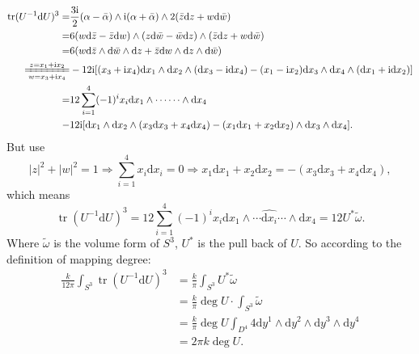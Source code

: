 \documentclass{book}
\begin{document}
\begin{equation*}
\begin{aligned}
\operatorname{tr} (U^{-1}\mathrm{d} U)^{3} = & \frac{3\mathrm{i}}{2}( \alpha -\bar{\alpha }) \land \mathrm{i}( \alpha +\bar{\alpha }) \land 2(\bar{z}\mathrm{d} z+w\mathrm{d}\bar{w})\\
= & 6( w\mathrm{d}\bar{z} -\bar{z}\mathrm{d} w) \land ( z\mathrm{d}\bar{w} -\bar{w}\mathrm{d} z) \land (\bar{z}\mathrm{d} z+w\mathrm{d}\bar{w})\\
= & 6( w\mathrm{d}\bar{z} \land \mathrm{d}\bar{w} \land \mathrm{d} z+\bar{z}\mathrm{d} w\land \mathrm{d} z\land \mathrm{d}\bar{w})\\
\xlongequal[w=x_{3} +\mathrm{i} x_{4}]{z=x_{1} +\mathrm{i} x_{2}} & -12\mathrm{i}[( x_{3} +\mathrm{i} x_{4})\mathrm{d} x_{1} \land \mathrm{d} x_{2} \land (\mathrm{d} x_{3} -\mathrm{id} x_{4}) -( x_{1} -\mathrm{i} x_{2})\mathrm{d} x_{3} \land \mathrm{d} x_{4} \land (\mathrm{d} x_{1} +\mathrm{id} x_{2})]\\
= & 12\sum _{i=1}^{4}( -1)^{i} x_{i}\mathrm{d} x_{1} \land \cdots \cdots \land \mathrm{d} x_{4}\\
- & 12\mathrm{i}[\mathrm{d} x_{1} \land \mathrm{d} x_{2} \land ( x_{3}\mathrm{d} x_{3} +x_{4}\mathrm{d} x_{4}) -( x_{1}\mathrm{d} x_{1} +x_{2}\mathrm{d} x_{2}) \land \mathrm{d} x_{3} \land \mathrm{d} x_{4}] .
\end{aligned}
\end{equation*}
But use
\begin{equation*}
| z| ^{2} +| w| ^{2} =1\Rightarrow \sum _{i=1}^{4} x_{i}\mathrm{d} x_{i} =0\Rightarrow x_{1}\mathrm{d} x_{1} +x_{2}\mathrm{d} x_{2} =-( x_{3}\mathrm{d} x_{3} +x_{4}\mathrm{d} x_{4}) ,
\end{equation*}
which means
\begin{equation*}
\operatorname{tr} (U^{-1}\mathrm{d} U)^{3} =12\sum _{i=1}^{4}( -1)^{i} x_{i}\mathrm{d} x_{1} \land \cdots \hat{\mathrm{d} x_{i}} \cdots \land \mathrm{d} x_{4} =12U^{*}\tilde{\omega } .
\end{equation*}
Where $\tilde{\omega }$ is the volume form of $S^{3}$, $U^{*}$ is the pull back of $U$. So according to the definition of mapping degree:
\begin{equation*}
\begin{aligned}
\frac{k}{12\pi }\int _{S^{3}}\operatorname{tr} (U^{-1}\mathrm{d} U)^{3} & =\frac{k}{\pi }\int _{S^{3}} U^{*}\tilde{\omega }\\
 & =\frac{k}{\pi }\deg U\cdot \int _{S^{3}}\tilde{\omega }\\
 & =\frac{k}{\pi }\deg U\int _{D^{4}} 4\mathrm{d} y^{1} \land \mathrm{d} y^{2} \land \mathrm{d} y^{3} \land \mathrm{d} y^{4}\\
 & =2\pi k\deg U.
\end{aligned}
\end{equation*}
\end{document}
